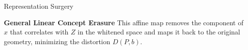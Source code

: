 \begin{question}{Representation Surgery}
\begin{subquestion}{\textbf{General Linear Concept Erasure}}
This affine map removes the component of $x$ that correlates with $Z$ in the whitened space and maps it back to the original geometry, minimizing the distortion $D(P,b)$.
\end{subquestion}

\end{question}